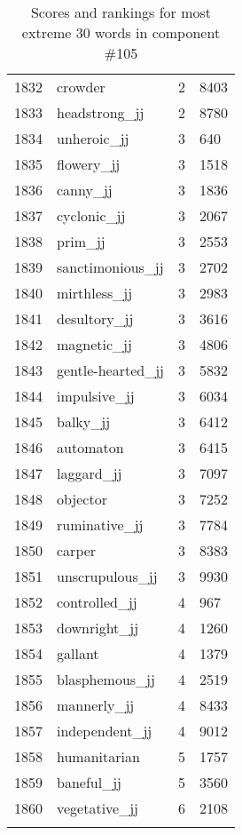 \begin{longtable}[!htbp]{| rlr@{.}l |}
    1832 & crowder & 2 & 8403 \\
    1833 & headstrong\_jj & 2 & 8780 \\
    1834 & unheroic\_jj & 3 & 640 \\
    1835 & flowery\_jj & 3 & 1518 \\
    1836 & canny\_jj & 3 & 1836 \\
    1837 & cyclonic\_jj & 3 & 2067 \\
    1838 & prim\_jj & 3 & 2553 \\
    1839 & sanctimonious\_jj & 3 & 2702 \\
    1840 & mirthless\_jj & 3 & 2983 \\
    1841 & desultory\_jj & 3 & 3616 \\
    1842 & magnetic\_jj & 3 & 4806 \\
    1843 & gentle-hearted\_jj & 3 & 5832 \\
    1844 & impulsive\_jj & 3 & 6034 \\
    1845 & balky\_jj & 3 & 6412 \\
    1846 & automaton & 3 & 6415 \\
    1847 & laggard\_jj & 3 & 7097 \\
    1848 & objector & 3 & 7252 \\
    1849 & ruminative\_jj & 3 & 7784 \\
    1850 & carper & 3 & 8383 \\
    1851 & unscrupulous\_jj & 3 & 9930 \\
    1852 & controlled\_jj & 4 & 967 \\
    1853 & downright\_jj & 4 & 1260 \\
    1854 & gallant & 4 & 1379 \\
    1855 & blasphemous\_jj & 4 & 2519 \\
    1856 & mannerly\_jj & 4 & 8433 \\
    1857 & independent\_jj & 4 & 9012 \\
    1858 & humanitarian & 5 & 1757 \\
    1859 & baneful\_jj & 5 & 3560 \\
    1860 & vegetative\_jj & 6 & 2108 \\
    \hline
    \caption{Scores and rankings for most extreme 30 words in component \#105} \\
\end{longtable}
